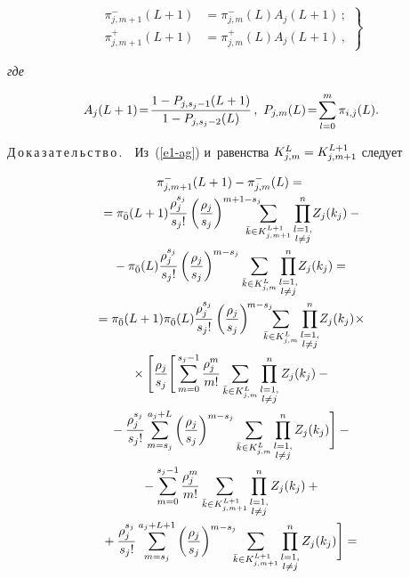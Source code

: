 \begin{multicols}{2}
\noindent
  \begin{equation}
  \left.
  \begin{array}{rl}
  \pi^-_{j,m+1} (L+1)&=  \pi^-_{j,m}(L) A_j(L+1)\,;\\[6pt]
  \pi^+_{j,m+1} (L+1) &= \pi^+_{j,m}(L) A_j(L+1)\,,
  \end{array}
  \right\}
  \label{e7-ag}
  \end{equation}
  

\noindent
\textit{где}

\noindent
\begin{equation*}
A_j(L+1) \!=\!\displaystyle\frac{\displaystyle 1-P_{j,s_j-1}(L+1)\mathstrut}{\displaystyle 1-P_{j,s_j-2}(L)\mathstrut}\,,\  
P_{j,m}(L)\!=\!\sum\limits^m_{l=0} \pi_{i,j}(L).
\end{equation*}
  
  \noindent
  Д\,о\,к\,а\,з\,а\,т\,е\,л\,ь\,с\,т\,в\,о\,.\ \ Из~(\ref{e1-ag}) и~равенства 
$K^L_{j,m}\hm= K_{j,m+1}^{L+1}$ сле\-дует 

\vspace*{-4pt}

\noindent
\begin{multline*}
  \pi^-_{j,m+1} (L+1) -\pi^-_{j,m}(L)= {}\\
  {}= \pi_{\bar{0}} (L+1) \fr{\rho_j^{s_j}}{s_j!} 
\left( \fr{\rho_j}{s_j}\right)^{m+1-s_j} \!\!\!\!\!\!\!\!\! \sum\limits_{\bar{k}\in K^{L+1}_{j,m+1}} 
\prod\limits^n_{{\substack{{l=1,}\\ {l\not=j}}}} \! Z_j(k_j)-{}\\
  {}-
   \pi_{\bar{0}}(L) \fr{\rho_j^{s_j}}{s_j!}\left( \fr{\rho_j}{s_j}\right)^{m-s_j} \sum\limits_{\bar{k}\in K^L_{j,m}} \prod\limits^n_{{\substack{{l=1,}\\ {l\not=j}}}}\! Z_j(k_j)={}\\
   {}=
   \pi_{\bar{0}} (L+1) \pi_{\bar{0}}(L) \fr{\rho_j^{s_j}}{s_j!} \left( \fr{\rho_j}{s_j}\right)^{\!m-s_j} \!\!\!\!\!\!
\sum\limits_{\bar{k}\in K^L_{j,m}} \prod\limits^n_{{\substack{{l=1,}\\ {l\not=j}}}} \!  Z_j(k_j)\!\times{}\\[-1pt]
   {}\times 
   \Bigg[ \fr{\rho_j}{s_j} \Bigg[ \sum\limits_{m=0}^{s_j-1} \fr{\rho_j^m}{m!} \sum\limits_{\bar{k}\in K^L_{j,m}}
    \prod\limits^n_{{\substack{{l=1,}\\ {l\not=j}}}} Z_j(k_j)-{}\\
    {}-\fr{\rho_j^{s_j}}{s_j!} \sum\limits_{m=s_j}^{a_j+L} \left( 
\fr{\rho_j}{s_j}\right)^{m-s_j} \sum\limits_{\bar{k}\in K^L_{j,m}} \prod\limits^n_{{\substack{{l=1,}\\ {l\not=j}}}} Z_j(k_j)\Bigg]-{}\\
{}- 
  \sum\limits_{m=0}^{s_j-1} \fr{\rho_j^m}{m!} \sum\limits_{\bar{k}\in 
K^{L+1}_{j,m+1}} \prod\limits^n_{{\substack{{l=1,}\\ {l\not=j}}}} Z_j(k_j) +{}\\[-1pt]
{}+  \fr{\rho_j^{s_j}}{s_j!} 
\sum\limits_{m=s_j}^{a_j+L+1} \left( \fr{\rho_j}{s_j}\right)^{m-s_j} \!\!\!
\sum\limits_{\bar{k}\in K^{L+1}_{j,m+1}} \prod\limits^n_{{\substack{{l=1,}\\ {l\not=j}}}} 
Z_j(k_j)\Bigg]={}
\end{multline*}


\end{multicols}
